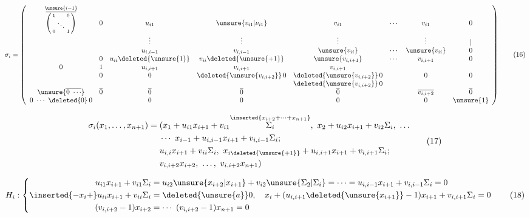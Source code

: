 \[
\sigma_i=
\left(\begin{array}{c c c c c c c c}
\overset{\unsure{i-1}}{\overline{\left(\begin{smallmatrix}1&&0\\&\ddots&\\0&&1\end{smallmatrix}\right)}}
 &0&u_{i1}&\unsure{v_{i1}|\nu_{i1}}&v_{i1}&\cdots&v_{i1}&0\\
 & &\vdots&\vdots&\vdots&&\vdots&\vert\\
 & &u_{i,i-1}&v_{i,i-1}&\unsure{v_{ii}}&\cdots&\unsure{v_{ii}}&0\\
 &0&u_{ii}\deleted{\unsure{1}}&v_{ii}\deleted{\unsure{+1}}&\unsure{v_{i,i+1}}&\cdots&v_{i,i+1}&0\\
0&1&u_{i,i+1}&v_{i,i+1}&v_{i,i+1}&&&\\
 &0&0&\deleted{\unsure{v_{i,i+2}}}\,0&\deleted{\unsure{v_{i,i+2}}}\,0&&0&0\\
 & & & &\deleted{\unsure{v_{i,i+2}}}\,0&&&\\
\unsure{\overline{0\ \cdots}}&\overline{0}&\overline{0}&\overline{0}&\overline{0}&&\overline{v_{i,i+2}}&\overline{0}\\
0\ \cdots\ \deleted{0}\,0& &0&0&0&&0&\unsure{1}
\end{array}\right)
\tag*{(16)}
\]

\[
\begin{aligned}
\sigma_i(x_1,\ldots,x_{n+1})={}&(x_1+u_{i1}x_{i+1}+v_{i1}\overset{\inserted{x_{i+2}+\cdots+x_{n+1}}}{\Sigma_i},\ x_2+u_{i2}x_{i+1}+v_{i2}\Sigma_i,\ \ldots\\
 &\cdots\ x_{i-1}+u_{i,i-1}x_{i+1}+v_{i,i-1}\Sigma_i;\\
 &u_{i,i}x_{i+1}+v_{ii}\Sigma_i,\ x_{i\deleted{\unsure{+1}}}+u_{i,i+1}x_{i+1}+v_{i,i+1}\Sigma_i;\\
 &v_{i,i+2}x_{i+2},\ \ldots,\ v_{i,i+2}x_{n+1})
\end{aligned}
\tag*{(17)}
\]

\[
H_i:\left\{\begin{aligned}
u_{i1}x_{i+1}+v_{i1}\Sigma_i&=u_{i2}\unsure{x_{i+2}|x_{i+1}}+v_{i2}\unsure{\Sigma_2|\Sigma_i}=\cdots=u_{i,i-1}x_{i+1}+v_{i,i-1}\Sigma_i=0\\
\inserted{-x_i+}u_{ii}x_{i+1}+v_{ii}\Sigma_i&=\deleted{\unsure{a}}0,\quad x_i+(u_{i,i+1}\deleted{\unsure{x_{i+1}}}-1)x_{i+1}+v_{i,i+1}\Sigma_i=0\\
(v_{i,i+2}-1)x_{i+2}&=\cdots\ (v_{i,i+2}-1)x_{n+1}=0
\end{aligned}\right.
\tag*{(18)}
\]

